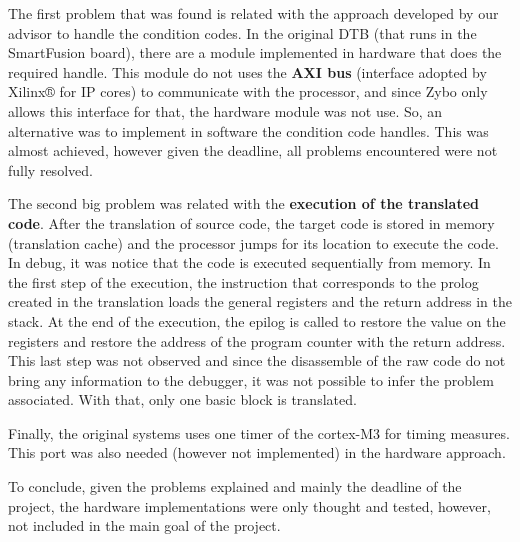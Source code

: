 The first problem that was found is related with the approach developed by our advisor to handle the condition codes. In the original DTB (that runs in the SmartFusion board), there are a module implemented in hardware that does the required handle. This module do not uses the \textbf{AXI bus} (interface adopted by Xilinx® for IP cores) to communicate with the processor, and since Zybo only allows this interface for that, the hardware module was not use. So, an alternative was to implement in software the condition code handles. This was almost achieved, however given the deadline, all problems encountered were not fully resolved.

The second big problem was related with the \textbf{execution of the translated code}. After the translation of source code, the target code is stored in memory (translation cache) and the processor jumps for its location to execute the code. In debug, it was notice that the code is executed sequentially from memory. In the first step of the execution, the instruction that corresponds to the prolog created in the translation loads the general registers and the return address in the stack. At the end of the execution, the epilog is called to restore the value on the registers and restore the address of the program counter with the return address. This last step was not observed and since the disassemble of the raw code do not bring any information to the debugger, it was not possible to infer the problem associated. With that, only one basic block is translated. 

Finally, the original systems uses one timer of the cortex-M3 for timing measures. This port was also needed (however not implemented) in the hardware approach.

To conclude, given the problems explained and mainly the deadline of the project, the hardware implementations were only thought and tested, however, not included in the main goal of the project.

